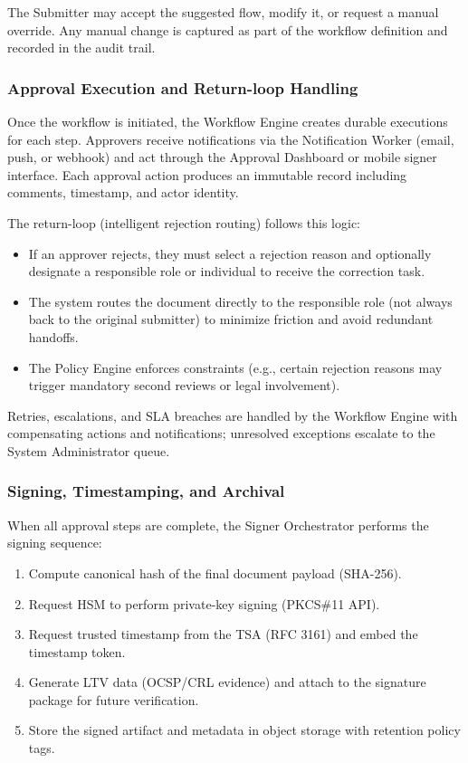 \documentclass[12pt,oneside,openright,a4paper]{cpe-english-project}
\begin{document}
The Submitter may accept the suggested flow, modify it, or request a
manual override. Any manual change is captured as part of the workflow
definition and recorded in the audit trail.

\subsubsection{Approval Execution and Return-loop Handling}

Once the workflow is initiated, the Workflow Engine creates durable
executions for each step. Approvers receive notifications via the
Notification Worker (email, push, or webhook) and act through the
Approval Dashboard or mobile signer interface. Each approval action
produces an immutable record including comments, timestamp, and actor
identity.

The return-loop (intelligent rejection routing) follows this logic:

\begin{itemize}
  \item If an approver rejects, they must select a rejection reason and
    optionally designate a responsible role or individual to receive the
    correction task.
  \item The system routes the document directly to the responsible
    role (not always back to the original submitter) to minimize
    friction and avoid redundant handoffs.
  \item The Policy Engine enforces constraints (e.g., certain rejection
    reasons may trigger mandatory second reviews or legal involvement).
\end{itemize}

Retries, escalations, and SLA breaches are handled by the Workflow
Engine with compensating actions and notifications; unresolved
exceptions escalate to the System Administrator queue.

\subsubsection{Signing, Timestamping, and Archival}

When all approval steps are complete, the Signer Orchestrator performs
the signing sequence:

\begin{enumerate}
  \item Compute canonical hash of the final document payload (SHA-256).
  \item Request HSM to perform private-key signing (PKCS\#11 API).
  \item Request trusted timestamp from the TSA (RFC 3161) and embed
    the timestamp token.
  \item Generate LTV data (OCSP/CRL evidence) and attach to the
    signature package for future verification.
  \item Store the signed artifact and metadata in object storage with
    retention policy tags.
\end{enumerate}
\end{document}
